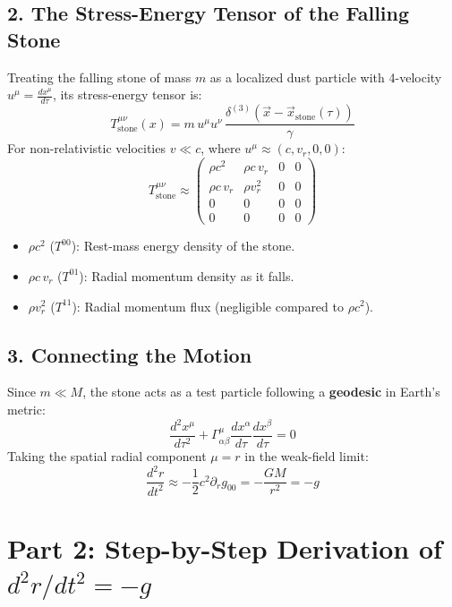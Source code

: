 \documentclass{article}
\begin{document}
	\subsection*{2. The Stress-Energy Tensor of the Falling Stone}
	Treating the falling stone of mass $m$ as a localized dust particle with 4-velocity $u^\mu = \frac{dx^\mu}{d\tau}$, its stress-energy tensor is:
	\begin{equation}
		T^{\mu\nu}_{\text{stone}}(x) = m \, u^\mu u^\nu \, \frac{\delta^{(3)}(\vec{x} - \vec{x}_{\text{stone}}(\tau))}{\gamma}
	\end{equation}
	For non-relativistic velocities $v \ll c$, where $u^\mu \approx (c, v_r, 0, 0)$:
	\begin{equation}
		T^{\mu\nu}_{\text{stone}} \approx \begin{pmatrix}
			\rho c^2 & \rho c \, v_r & 0 & 0 \\
			\rho c \, v_r & \rho v_r^2 & 0 & 0 \\
			0 & 0 & 0 & 0 \\
			0 & 0 & 0 & 0
		\end{pmatrix}
	\end{equation}
	\begin{itemize}
		\item $\rho c^2$ ($T^{00}$): Rest-mass energy density of the stone.
		\item $\rho c \, v_r$ ($T^{01}$): Radial momentum density as it falls.
		\item $\rho v_r^2$ ($T^{11}$): Radial momentum flux (negligible compared to $\rho c^2$).
	\end{itemize}
	
	\subsection*{3. Connecting the Motion}
	Since $m \ll M$, the stone acts as a test particle following a \textbf{geodesic} in Earth's metric:
	\begin{equation}
		\frac{d^2 x^\mu}{d\tau^2} + \Gamma^\mu_{\alpha\beta} \frac{dx^\alpha}{d\tau} \frac{dx^\beta}{d\tau} = 0
	\end{equation}
	Taking the spatial radial component $\mu = r$ in the weak-field limit:
	\begin{equation}
		\frac{d^2 r}{dt^2} \approx -\frac{1}{2} c^2 \partial_r g_{00} = -\frac{GM}{r^2} = -g
	\end{equation}
	
	\newpage
	
	\section*{Part 2: Step-by-Step Derivation of $d^2r/dt^2 = -g$}
	
\end{document}
